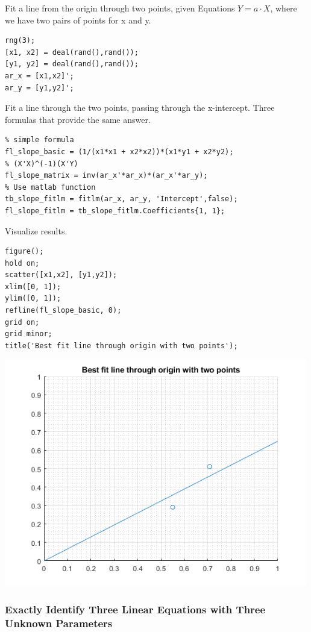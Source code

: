 \documentclass[
]{book}
\begin{document}
Fit a line from the origin through two points, given Equations
\(Y=a\cdot X\), where we have two pairs of points for x and y.

\begin{verbatim}
rng(3);
[x1, x2] = deal(rand(),rand());
[y1, y2] = deal(rand(),rand());
ar_x = [x1,x2]';
ar_y = [y1,y2]';
\end{verbatim}

Fit a line through the two points, passing through the x-intercept.
Three formulas that provide the same answer.

\begin{verbatim}
% simple formula
fl_slope_basic = (1/(x1*x1 + x2*x2))*(x1*y1 + x2*y2);
% (X'X)^(-1)(X'Y)
fl_slope_matrix = inv(ar_x'*ar_x)*(ar_x'*ar_y);
% Use matlab function
tb_slope_fitlm = fitlm(ar_x, ar_y, 'Intercept',false);
fl_slope_fitlm = tb_slope_fitlm.Coefficients{1, 1};
\end{verbatim}

Visualize results.

\begin{verbatim}
figure();
hold on;
scatter([x1,x2], [y1,y2]);
xlim([0, 1]);
ylim([0, 1]);
refline(fl_slope_basic, 0);
grid on;
grid minor;
title('Best fit line through origin with two points');
\end{verbatim}

\includegraphics[width=5.20833in,height=\textheight]{img/fs_linear_ols_images/figure_0.png}

\hypertarget{exactly-identify-three-linear-equations-with-three-unknown-parameters}{%
\subsubsection{Exactly Identify Three Linear Equations with Three Unknown Parameters}\label{exactly-identify-three-linear-equations-with-three-unknown-parameters}}
\end{document}

